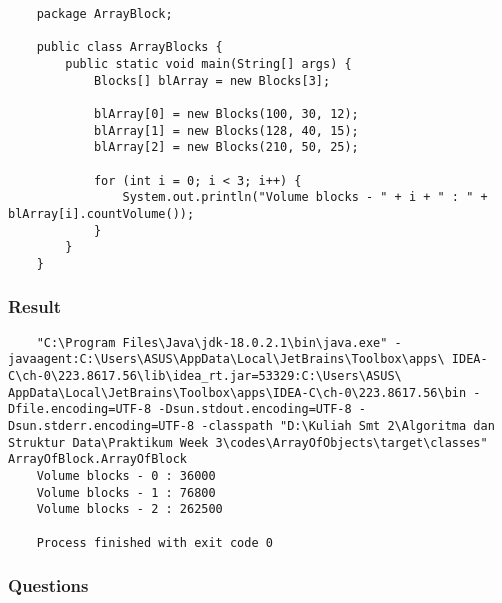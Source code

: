\documentclass[12pt,titlepage]{article}
\begin{document}
\begin{verbatim}
    package ArrayBlock;

    public class ArrayBlocks {
        public static void main(String[] args) {
            Blocks[] blArray = new Blocks[3];

            blArray[0] = new Blocks(100, 30, 12);
            blArray[1] = new Blocks(128, 40, 15);
            blArray[2] = new Blocks(210, 50, 25);

            for (int i = 0; i < 3; i++) {
                System.out.println("Volume blocks - " + i + " : " + blArray[i].countVolume());
            }
        }
    }
\end{verbatim}

\subsubsection{Result}

\newpage

\begin{verbatim}
    "C:\Program Files\Java\jdk-18.0.2.1\bin\java.exe" - javaagent:C:\Users\ASUS\AppData\Local\JetBrains\Toolbox\apps\ IDEA-C\ch-0\223.8617.56\lib\idea_rt.jar=53329:C:\Users\ASUS\ AppData\Local\JetBrains\Toolbox\apps\IDEA-C\ch-0\223.8617.56\bin -Dfile.encoding=UTF-8 -Dsun.stdout.encoding=UTF-8 -Dsun.stderr.encoding=UTF-8 -classpath "D:\Kuliah Smt 2\Algoritma dan Struktur Data\Praktikum Week 3\codes\ArrayOfObjects\target\classes" ArrayOfBlock.ArrayOfBlock
    Volume blocks - 0 : 36000
    Volume blocks - 1 : 76800
    Volume blocks - 2 : 262500

    Process finished with exit code 0

\end{verbatim}

\subsubsection{Questions}
\end{document}
